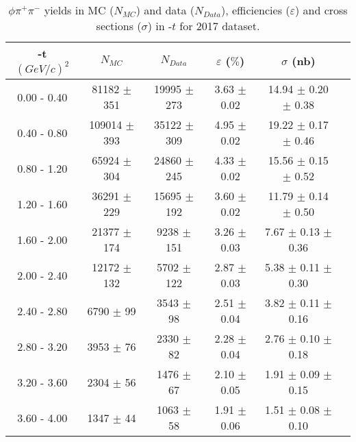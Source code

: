 \begin{center}
\null
\vfill
\begin{table}[H]
    \caption{$\phi \pi^{+}\pi^{-}$ yields in MC ($N_{MC}$) and data ($N_{Data}$), efficiencies ($\varepsilon$) and cross sections ($\sigma$) in -$t$ for 2017 dataset.}
    \label{tab.y2175.xsec_ul.phi2pi.2.2}
    \begin{tabular}{|c|c|c|c|c|c|}
    \hline
    -t $(GeV/c)^{2}$ & $N_{MC}$ & $N_{Data}$ & $\varepsilon$ ($\%$) & $\sigma$ (nb) \\ 
    \hline
    0.00 - 0.40 & 81182 $\pm$ 351 & 19995 $\pm$ 273 & 3.63 $\pm$ 0.02 & 14.94 $\pm$ 0.20 $\pm$ 0.38 \\ 
    0.40 - 0.80 & 109014 $\pm$ 393 & 35122 $\pm$ 309 & 4.95 $\pm$ 0.02 & 19.22 $\pm$ 0.17 $\pm$ 0.46 \\ 
    0.80 - 1.20 & 65924 $\pm$ 304 & 24860 $\pm$ 245 & 4.33 $\pm$ 0.02 & 15.56 $\pm$ 0.15 $\pm$ 0.52 \\ 
    1.20 - 1.60 & 36291 $\pm$ 229 & 15695 $\pm$ 192 & 3.60 $\pm$ 0.02 & 11.79 $\pm$ 0.14 $\pm$ 0.50 \\ 
    1.60 - 2.00 & 21377 $\pm$ 174 & 9238 $\pm$ 151 & 3.26 $\pm$ 0.03 & 7.67 $\pm$ 0.13 $\pm$ 0.36 \\ 
    2.00 - 2.40 & 12172 $\pm$ 132 & 5702 $\pm$ 122 & 2.87 $\pm$ 0.03 & 5.38 $\pm$ 0.11 $\pm$ 0.30 \\ 
    2.40 - 2.80 & 6790 $\pm$ 99 & 3543 $\pm$ 98 & 2.51 $\pm$ 0.04 & 3.82 $\pm$ 0.11 $\pm$ 0.16 \\ 
    2.80 - 3.20 & 3953 $\pm$ 76 & 2330 $\pm$ 82 & 2.28 $\pm$ 0.04 & 2.76 $\pm$ 0.10 $\pm$ 0.18 \\ 
    3.20 - 3.60 & 2304 $\pm$ 56 & 1476 $\pm$ 67 & 2.10 $\pm$ 0.05 & 1.91 $\pm$ 0.09 $\pm$ 0.15 \\ 
    3.60 - 4.00 & 1347 $\pm$ 44 & 1063 $\pm$ 58 & 1.91 $\pm$ 0.06 & 1.51 $\pm$ 0.08 $\pm$ 0.10 \\    
   \hline
\end{tabular}
\end{table}
\end{center}
   
